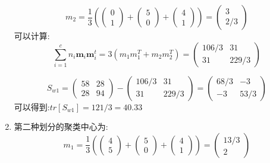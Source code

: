 \documentclass[homework]{IEEEtran}
\begin{document}
\begin{CJK}{UTF8}{gkai}
\begin{enumerate}
    $$
    m_2 = \frac{1}{3} \left(
    \begin{pmatrix}0 \\ 1\end{pmatrix}+\begin{pmatrix}5 \\ 0\end{pmatrix}+\begin{pmatrix}4 \\ 1\end{pmatrix} \right)
    = \begin{pmatrix}3 \\ 2/3\end{pmatrix}
    $$
    可以计算:
$$
\sum_{i=1}^{c} n_{i} \mathbf{m}_{i} \mathbf{m}_{i}^{t} = 3\left(m_1m_{1}^T+m_2m_{2}^T\right)
=
\begin{pmatrix}106 / 3 & 31\\ 31 & 229 /3\end{pmatrix}
$$

$$
S_{w1} = \begin{pmatrix}58 & 28 \\28 & 94\end{pmatrix}-\begin{pmatrix}106 / 3 & 31\\ 31 & 229 /3\end{pmatrix}
=\begin{pmatrix}68 / 3 & -3\\ -3 & 53 /3\end{pmatrix}
$$
可以得到:$tr\left[S_{w1} \right] = 121/3 = 40.33$
\item 第二种划分的聚类中心为:
$$
 m_1 = \frac{1}{3} \left(
\begin{pmatrix}4 \\ 5\end{pmatrix}+\begin{pmatrix}5 \\ 0\end{pmatrix}+\begin{pmatrix}4 \\ 1\end{pmatrix} \right)
= \begin{pmatrix}13/3 \\ 2\end{pmatrix}
$$


\end{enumerate}
\end{CJK}
\end{document}
